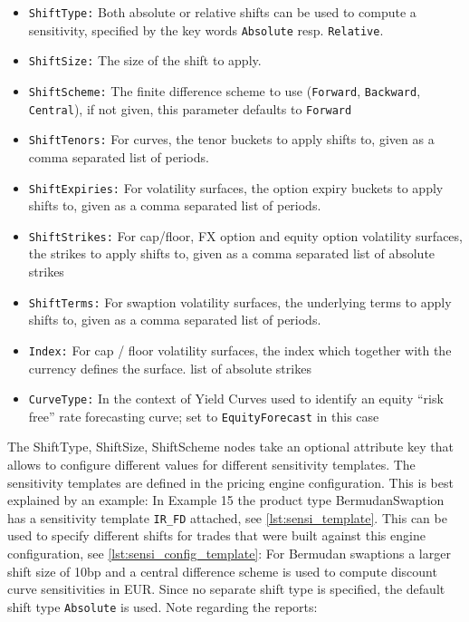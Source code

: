 \documentclass[12pt, a4paper]{article}
\begin{document}
{\begin{itemize}
\item {\tt ShiftType:} Both absolute or relative shifts can be used to compute a sensitivity, specified by the key words
  {\tt Absolute} resp. {\tt Relative}.
\item {\tt ShiftSize:} The size of the shift to apply.
\item {\tt ShiftScheme:} The finite difference scheme to use ({\tt Forward}, {\tt Backward}, {\tt Central}), if not given, this parameter defaults to {\tt Forward}
\item {\tt ShiftTenors:} For curves, the tenor buckets to apply shifts to, given as a comma separated list of periods.
\item {\tt ShiftExpiries:} For volatility surfaces, the option expiry buckets to apply shifts to, given as a comma
  separated list of periods.
\item {\tt ShiftStrikes:} For cap/floor, FX option and equity option volatility surfaces, the strikes to apply shifts to, given as a comma separated
  list of absolute strikes
\item {\tt ShiftTerms:} For swaption volatility surfaces, the underlying terms to apply shifts to, given as a comma
  separated list of periods.
\item {\tt Index:} For cap / floor volatility surfaces, the index which together with the currency defines the surface.
  list of absolute strikes
\item {\tt CurveType:} In the context of Yield Curves used to identify an equity ``risk free'' rate forecasting curve; set to {\tt EquityForecast} in this case
\end{itemize}

The ShiftType, ShiftSize, ShiftScheme nodes take an optional attribute key that allows to configure different values for
different sensitivity templates. The sensitivity templates are defined in the pricing engine configuration. This is best
explained by an example: In Example 15 the product type BermudanSwaption has a sensitivity template \verb+IR_FD+
attached, see \ref{lst:sensi_template}. This can be used to specify different shifts for trades that were built against
this engine configuration, see \ref{lst:sensi_config_template}: For Bermudan swaptions a larger shift size of 10bp and a
central difference scheme is used to compute discount curve sensitivities in EUR. Since no separate shift type is
specified, the default shift type {\tt Absolute} is used. Note regarding the reports:

}
\end{document}
